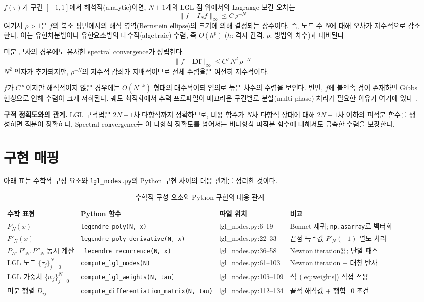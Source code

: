 \documentclass[11pt]{article}
\begin{document}
$f(\tau)$가 구간 $[-1, 1]$에서 해석적(analytic)이면, $N+1$개의 LGL 점 위에서의 Lagrange 보간 오차는
\[
\|f - I_N f\|_\infty \leq C\, \rho^{-N}
\]
여기서 $\rho > 1$은 $f$의 복소 평면에서의 해석 영역(Bernstein ellipse)의 크기에 의해 결정되는 상수이다. 즉, 노드 수 $N$에 대해 오차가 지수적으로 감소한다. 이는 유한차분법이나 유한요소법의 대수적(algebraic) 수렴, 즉 $O(h^p)$ ($h$: 격자 간격, $p$: 방법의 차수)과 대비된다.

미분 근사의 경우에도 유사한 spectral convergence가 성립한다.
\[
\|\dot{f} - \mathbf{D} \mathbf{f}\|_\infty \leq C'\, N^2\, \rho^{-N}
\]
$N^2$ 인자가 추가되지만, $\rho^{-N}$의 지수적 감쇠가 지배적이므로 전체 수렴율은 여전히 지수적이다.

$f$가 $C^\infty$이지만 해석적이지 않은 경우에는 $O(N^{-k})$ 형태의 대수적이되 임의로 높은 차수의 수렴을 보인다. 반면, $f$에 불연속 점이 존재하면 Gibbs 현상으로 인해 수렴이 크게 저하된다. 궤도 최적화에서 추력 프로파일이 매끄러운 구간별로 분할(multi-phase) 처리가 필요한 이유가 여기에 있다~\cite{Patterson2014}.

\textbf{구적 정확도와의 관계.} LGL 구적법은 $2N-1$차 다항식까지 정확하므로, 비용 함수가 $N$차 다항식 상태에 대해 $2N-1$차 이하의 피적분 함수를 생성하면 적분이 정확하다. Spectral convergence는 이 다항식 정확도를 넘어서는 비다항식 피적분 함수에 대해서도 급속한 수렴을 보장한다.

\section{구현 매핑}
\label{sec:impl}

아래 표는 수학적 구성 요소와 \texttt{lgl\_nodes.py}의 Python 구현 사이의 대응 관계를 정리한 것이다.

\begin{table}[htbp]
\centering
\caption{수학적 구성 요소와 Python 구현의 대응 관계}
\label{tab:mapping}
\small
\begin{tabular}{@{}llll@{}}
\toprule
수학 표현 & Python 함수 & 파일 위치 & 비고 \\
\midrule
$P_N(x)$ & \texttt{legendre\_poly(N, x)} & lgl\_nodes.py:6--19 & Bonnet 재귀; \texttt{np.asarray}로 벡터화 \\
$P'_N(x)$ & \texttt{legendre\_poly\_derivative(N, x)} & lgl\_nodes.py:22--33 & 끝점 특수값 $P'_N(\pm 1)$ 별도 처리 \\
$P_N, P'_N, P''_N$ 동시 계산 & \texttt{\_legendre\_recurrence(N, x)} & lgl\_nodes.py:36--58 & Newton iteration용; 단일 패스 \\
LGL 노드 $\{\tau_j\}_{j=0}^N$ & \texttt{compute\_lgl\_nodes(N)} & lgl\_nodes.py:61--103 & Newton iteration + 대칭 반사 \\
LGL 가중치 $\{w_j\}_{j=0}^N$ & \texttt{compute\_lgl\_weights(N, tau)} & lgl\_nodes.py:106--109 & 식~(\ref{eq:weights}) 직접 적용 \\
미분 행렬 $D_{ij}$ & \texttt{compute\_differentiation\_matrix(N, tau)} & lgl\_nodes.py:112--134 & 끝점 해석값 + 행합=0 조건 \\
\bottomrule
\end{tabular}
\end{table}
\end{document}

